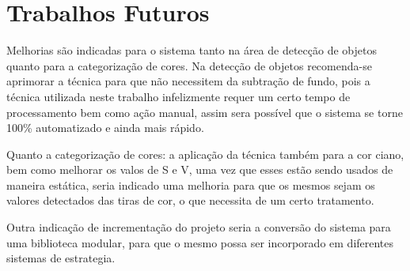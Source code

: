 \section{Trabalhos Futuros}
Melhorias são indicadas para o sistema tanto na área de detecção de objetos quanto para a categorização de cores. Na detecção de objetos recomenda-se aprimorar a técnica para que não necessitem da subtração de fundo, pois a técnica utilizada neste trabalho infelizmente requer um certo tempo de processamento bem como ação manual, assim sera possível que o sistema se torne 100\% automatizado e ainda mais rápido.

 Quanto a categorização de cores: a aplicação da técnica também para a cor ciano, bem como melhorar os valos de S e V, uma vez que esses estão sendo usados de maneira estática, seria indicado uma melhoria para que os mesmos sejam os valores detectados das tiras de cor, o que necessita de um certo tratamento.
 
Outra indicação de incrementação do projeto seria a conversão do sistema para uma biblioteca modular, para que o mesmo possa ser incorporado em diferentes sistemas de estrategia. 